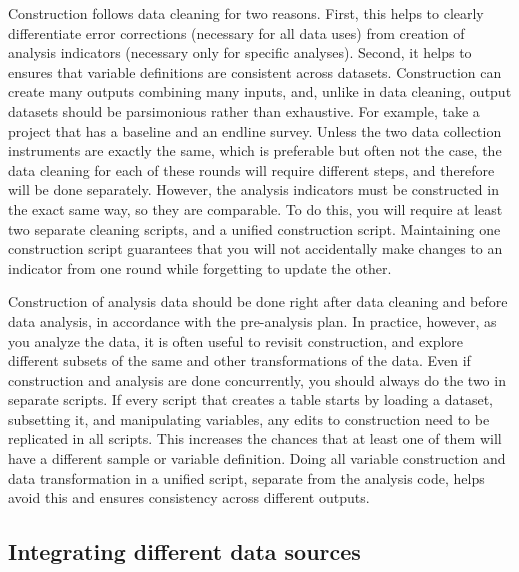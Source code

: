 Construction follows data cleaning for two reasons.
First, this helps to clearly differentiate error corrections (necessary for all data uses)
from creation of analysis indicators (necessary only for specific analyses).
Second, it helps to ensures that variable definitions are consistent across datasets.
Construction can create many outputs combining many inputs,
and, unlike in data cleaning, output datasets should be parsimonious rather than exhaustive.
For example, take a project that has a baseline and an endline survey.
Unless the two data collection instruments are exactly the same,
which is preferable but often not the case,
the data cleaning for each of these rounds will require different steps,
and therefore will be done separately.
However, the analysis indicators must be constructed in the exact same way, 
so they are comparable.
To do this, you will require at least two separate cleaning scripts,
and a unified construction script.
Maintaining one construction script guarantees that you will not
accidentally make changes to an indicator from one round
while forgetting to update the other.

Construction of analysis data should be done right 
after data cleaning and before data analysis,
in accordance with the pre-analysis plan.
In practice, however, as you analyze the data,
it is often useful to revisit construction,
and explore different subsets of the same and other transformations of the data.
Even if construction and analysis are done concurrently,
you should always do the two in separate scripts.
If every script that creates a table starts by loading a dataset,
subsetting it, and manipulating variables,
any edits to construction need to be replicated in all scripts.
This increases the chances that at least one of them will have a different sample or variable definition.
Doing all variable construction and data transformation
in a unified script, separate from the analysis code, helps
avoid this and ensures consistency across different outputs.

\subsection{Integrating different data sources}

